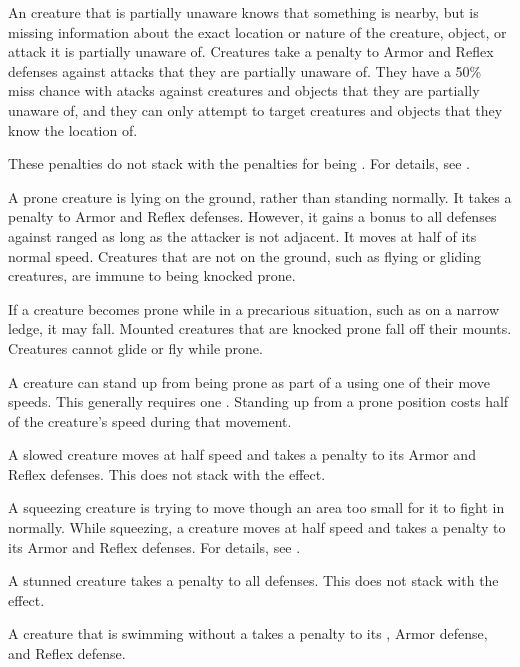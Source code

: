    An creature that is partially unaware knows that something is nearby, but is missing information about the exact location or nature of the creature, object, or attack it is partially unaware of.
  Creatures take a  penalty to Armor and Reflex defenses against attacks that they are partially unaware of.
  They have a 50\% miss chance with  atacks against creatures and objects that they are partially unaware of, and they can only attempt to target creatures and objects that they know the location of.

  These penalties do not stack with the penalties for being \unaware.
  For details, see .

   A prone creature is lying on the ground, rather than standing normally.
  It takes a  penalty to Armor and Reflex defenses.
  However, it gains a  bonus to all defenses against ranged  as long as the attacker is not adjacent.
  It moves at half of its normal speed.
  Creatures that are not on the ground, such as flying or gliding creatures, are immune to being knocked prone.

  If a creature becomes prone while in a precarious situation, such as on a narrow ledge, it may fall.
  Mounted creatures that are knocked prone fall off their mounts.
  Creatures cannot glide or fly while prone.

  A creature can stand up from being prone as part of a  using one of their move speeds.
  This generally requires one .
  Standing up from a prone position costs half of the creature's speed during that movement.

   A slowed creature moves at half speed and takes a  penalty to its Armor and Reflex defenses.
  This does not stack with the \immobilized effect.

   A squeezing creature is trying to move though an area too small for it to fight in normally.
  While squeezing, a creature moves at half speed and takes a  penalty to its Armor and Reflex defenses.
  For details, see .

   A stunned creature takes a  penalty to all defenses.
  This does not stack with the \confused effect.

   A creature that is swimming without a  takes a  penalty to its , Armor defense, and Reflex defense.

